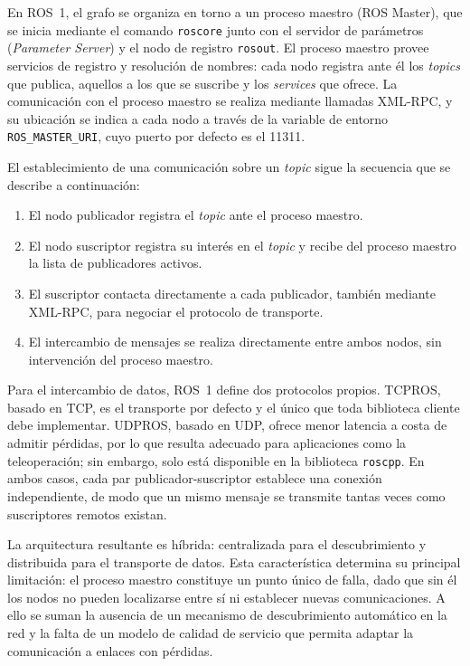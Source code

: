 En ROS~1, el grafo se organiza en torno a un proceso maestro (ROS Master), que
se inicia mediante el comando \texttt{roscore} junto con el servidor de
parámetros (\textit{Parameter Server}) y el nodo de registro \texttt{rosout}.
El proceso maestro provee servicios de registro y resolución de nombres: cada
nodo registra ante él los \textit{topics} que publica, aquellos a los que se
suscribe y los \textit{services} que ofrece. La comunicación con el proceso
maestro se realiza mediante llamadas XML-RPC, y su ubicación se indica a cada
nodo a través de la variable de entorno \texttt{ROS\_MASTER\_URI}, cuyo puerto
por defecto es el 11311.

El establecimiento de una comunicación sobre un \textit{topic} sigue la
secuencia que se describe a continuación:
\begin{enumerate}
    \item El nodo publicador registra el \textit{topic} ante el proceso
    maestro.
    \item El nodo suscriptor registra su interés en el \textit{topic} y recibe
    del proceso maestro la lista de publicadores activos.
    \item El suscriptor contacta directamente a cada publicador, también
    mediante XML-RPC, para negociar el protocolo de transporte.
    \item El intercambio de mensajes se realiza directamente entre ambos
    nodos, sin intervención del proceso maestro.
\end{enumerate}

Para el intercambio de datos, ROS~1 define dos protocolos propios. TCPROS,
basado en TCP, es el transporte por defecto y el único que toda biblioteca
cliente debe implementar. UDPROS, basado en UDP, ofrece menor latencia a costa
de admitir pérdidas, por lo que resulta adecuado para aplicaciones como la
teleoperación; sin embargo, solo está disponible en la biblioteca
\texttt{roscpp}. En ambos casos, cada par publicador-suscriptor establece una
conexión independiente, de modo que un mismo mensaje se transmite tantas veces
como suscriptores remotos existan.

La arquitectura resultante es híbrida: centralizada para el descubrimiento y
distribuida para el transporte de datos. Esta característica determina su
principal limitación: el proceso maestro constituye un punto único de falla,
dado que sin él los nodos no pueden localizarse entre sí ni establecer nuevas
comunicaciones. A ello se suman la ausencia de un mecanismo de descubrimiento
automático en la red y la falta de un modelo de calidad de servicio que permita
adaptar la comunicación a enlaces con pérdidas.

